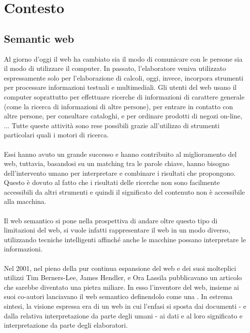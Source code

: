 \documentclass{article}
\theoremstyle{plain}
\theoremstyle{definition}
\begin{document}
\newpage
\section{Contesto}
\subsection{Semantic web}
Al giorno d'oggi il web ha cambiato sia il modo di comunicare con le persone sia il modo di utilizzare il computer. In passato, l'elaboratore veniva utilizzato espressamente solo per l'elaborazione di calcoli, oggi, invece, incorpora strumenti per processare informazioni testuali e multimediali. Gli utenti del web usano il computer soprattutto per effettuare ricerche di informazioni di carattere generale (come la ricerca di informazioni di altre persone), per entrare in contatto con altre persone, per consultare cataloghi, e per ordinare prodotti di negozi on-line, ... Tutte queste attività sono rese possibili grazie all'utilizzo di strumenti particolari quali i motori di ricerca. 
\\
\\
Essi hanno avuto un grande successo e hanno contribuito al miglioramento del web, tuttavia, basandosi su un matching tra le parole chiave, hanno bisogno dell'intervento umano per interpretare e combinare i risultati che propongono. Questo è dovuto al fatto che i risultati delle ricerche non sono facilmente accessibili da altri strumenti e quindi il significato del contenuto non è accessibile alla macchina. 
\\
\\
Il web semantico si pone nella prospettiva di andare oltre questo tipo di limitazioni del web, si vuole infatti rappresentare il web in un modo diverso, utilizzando tecniche intelligenti affinché anche le macchine possano interpretare le informazioni.
\\
\\
Nel 2001, nel pieno della pur continua espansione del web e dei suoi molteplici utilizzi Tim Berners-Lee, James Hendler, e Ora Lassila pubblicavano un articolo che sarebbe diventato una pietra miliare. In esso l'inventore del web, insieme ai suoi co-autori lanciavano il web semantico definendolo come una . In estrema sintesi, la visione espressa era di un web in cui l'enfasi si sposta dai documenti - e dalla relativa interpretazione da parte degli umani - ai dati e al loro significato e interpretazione da parte degli elaboratori.
\end{document}
